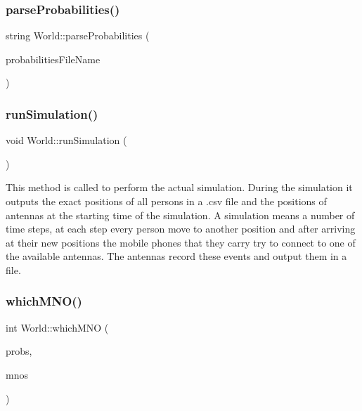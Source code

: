 \subsubsection{\texorpdfstring{parse\+Probabilities()}{parseProbabilities()}}
{\footnotesize\ttfamily string World\+::parse\+Probabilities (\begin{DoxyParamCaption}\item[{const string \&}]{probabilities\+File\+Name }\end{DoxyParamCaption})\hspace{0.3cm}{\ttfamily [private]}}

\mbox{\label{class_world_aa825a43f968c8fe750c67156e64721ff}} 
\subsubsection{\texorpdfstring{run\+Simulation()}{runSimulation()}}
{\footnotesize\ttfamily void World\+::run\+Simulation (\begin{DoxyParamCaption}{ }\end{DoxyParamCaption})\hspace{0.3cm}{\ttfamily [noexcept]}}

This method is called to perform the actual simulation. During the simulation it outputs the exact positions of all persons in a .csv file and the positions of antennas at the starting time of the simulation. A simulation means a number of time steps, at each step every person move to another position and after arriving at their new positions the mobile phones that they carry try to connect to one of the available antennas. The antennas record these events and output them in a file. \mbox{\label{class_world_a9a982977a44c9e8a4724eaa1e4108679}} 
\subsubsection{\texorpdfstring{which\+M\+N\+O()}{whichMNO()}}
{\footnotesize\ttfamily int World\+::which\+M\+NO (\begin{DoxyParamCaption}\item[{vector$<$ pair$<$ string, double $>$$>$}]{probs,  }\item[{vector$<$ Mobile\+Operator $\ast$$>$}]{mnos }\end{DoxyParamCaption})\hspace{0.3cm}{\ttfamily [private]}}

